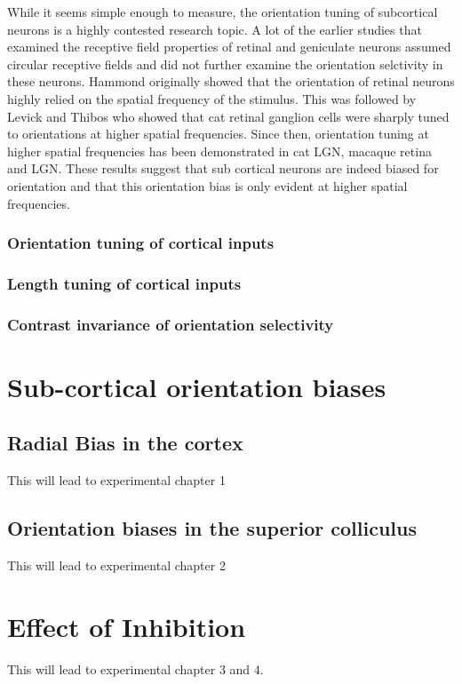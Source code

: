 	While it seems simple enough to measure, the orientation tuning of subcortical neurons is a highly contested research topic. A lot of the earlier studies that examined the receptive field properties of retinal and geniculate neurons assumed circular receptive fields and did not further examine the orientation selctivity in these neurons. Hammond originally showed that the orientation of retinal neurons highly relied on the spatial frequency of the stimulus. This was followed by Levick and Thibos who showed that cat retinal ganglion cells were sharply tuned to orientations at higher spatial frequencies. Since then, orientation tuning at higher spatial frequencies has been demonstrated in cat LGN, macaque retina and LGN. These results suggest that sub cortical neurons are indeed biased for orientation and that this orientation bias is only evident at higher spatial frequencies.
	
	\subsubsection{Orientation tuning of cortical inputs}
	
	\subsubsection{Length tuning of cortical inputs}
	
	\subsubsection{Contrast invariance of orientation selectivity}
	
	
	
	
	
	\section{Sub-cortical orientation biases}
	
	\subsection{Radial Bias in the cortex}
	This will lead to experimental chapter 1
	\subsection{Orientation biases in the superior colliculus}
	This will lead to experimental chapter 2
	\section{Effect of Inhibition}
	This will lead to experimental chapter 3 and 4.
	
